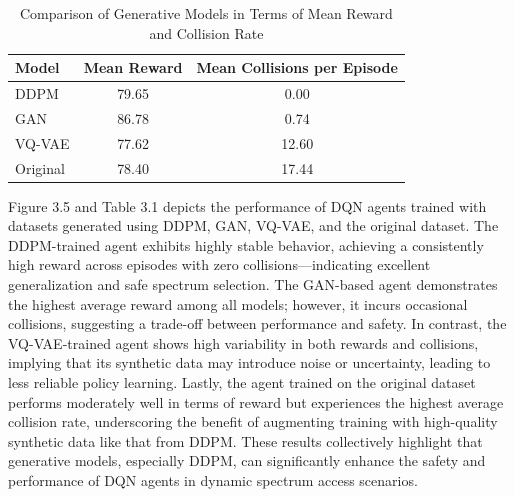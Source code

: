 \begin{table}[ht]
    \centering
    \caption{Comparison of Generative Models in Terms of Mean Reward and Collision Rate}
    \begin{tabular}{|l|c|c|}
    \hline
    \textbf{Model} & \textbf{Mean Reward} & \textbf{Mean Collisions per Episode} \\
    \hline
    DDPM     & 79.65   & 0.00    \\
    GAN      & 86.78   & 0.74    \\
    VQ-VAE   & 77.62   & 12.60   \\
    Original & 78.40   & 17.44   \\
    \hline
    \end{tabular}
    \label{tab:reward_collision_comparison}
\end{table}
   
    Figure 3.5 and Table 3.1 depicts the performance of DQN agents trained with datasets generated using DDPM, GAN, VQ-VAE, and the original dataset. 
    The DDPM-trained agent exhibits highly stable behavior, achieving a consistently high reward across episodes with zero collisions—indicating excellent 
    generalization and safe spectrum selection. The GAN-based agent demonstrates the highest average reward among all models; however, it incurs occasional 
    collisions, suggesting a trade-off between performance and safety. In contrast, the VQ-VAE-trained agent shows high variability in both rewards and collisions, 
    implying that its synthetic data may introduce noise or uncertainty, leading to less reliable policy learning. Lastly, the agent trained on the original dataset 
    performs moderately well in terms of reward but experiences the highest average collision rate, underscoring the benefit of augmenting training with high-quality
     synthetic data like that from DDPM. These results collectively highlight that generative models, especially DDPM, can significantly enhance the safety and 
     performance of DQN agents in dynamic spectrum access scenarios.

